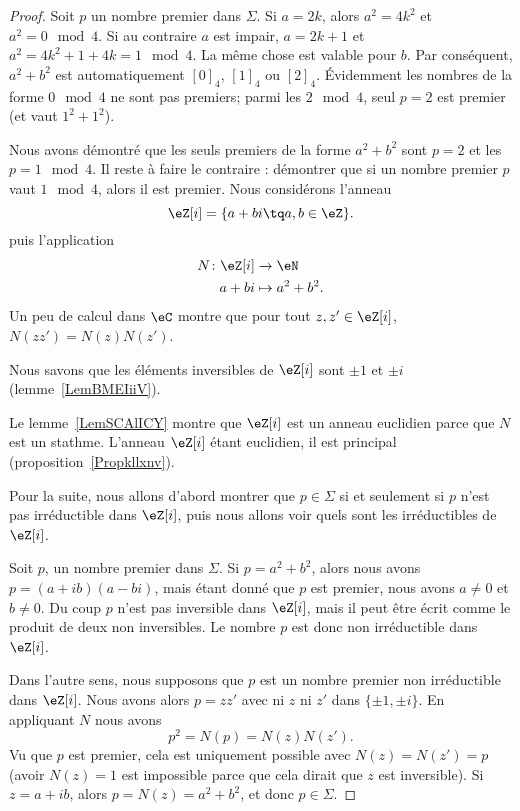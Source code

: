 \begin{proof}
    Soit \( p\) un nombre premier dans \( \Sigma\). Si \( a=2k\), alors \( a^2=4k^2\) et \( a^2=0\mod 4\). Si au contraire \( a\) est impair, \( a=2k+1\) et \( a^2=4k^2+1+4k=1\mod 4\). La même chose est valable pour \( b\). Par conséquent, \( a^2+b^2\) est automatiquement \( [0]_4\), \( [1]_4\) ou \( [2]_4\). Évidemment les nombres de la forme \( 0\mod 4\) ne sont pas premiers; parmi les \( 2\mod 4\), seul \( p=2\) est premier (et vaut \( 1^2+1^2\)).

    Nous avons démontré que les seuls premiers de la forme \( a^2+b^2\) sont \( p=2\) et les \( p=1\mod 4\). Il reste à faire le contraire : démontrer que si un nombre premier \( p\) vaut \( 1\mod 4\), alors il est premier. Nous considérons l'anneau
    \begin{equation}
        \eZ[i]=\{ a+bi\tq a,b\in \eZ \}.
    \end{equation}
    puis l'application
    \begin{equation}
        \begin{aligned}
            N\colon \eZ[i]&\to \eN \\
            a+bi&\mapsto a^2+b^2.
        \end{aligned}
    \end{equation}
    Un peu de calcul dans \( \eC\) montre que pour tout \( z,z'\in \eZ[i]\), \( N(zz')=N(z)N(z')\).


    Nous savons que les éléments inversibles de \( \eZ[i]\) sont \( \pm 1\) et \( \pm i\) (lemme~\ref{LemBMEIiiV}).

    Le lemme~\ref{LemSCAlICY} montre que \( \eZ[i]\) est un anneau euclidien parce que \( N\) est un stathme. L'anneau \( \eZ[i]\) étant euclidien, il est principal (proposition~\ref{Propkllxnv}).



    Pour la suite, nous allons d'abord montrer que \( p\in\Sigma\) si et seulement si \( p\) n'est pas irréductible dans \( \eZ[i]\), puis nous allons voir quels sont les irréductibles de \( \eZ[i]\).

    Soit \( p\), un nombre premier dans \( \Sigma\). Si \( p=a^2+b^2\), alors nous avons \( p=(a+ib)(a-bi)\), mais étant donné que \( p\) est premier, nous avons \( a\neq 0\) et \( b\neq 0\). Du coup \( p\) n'est pas inversible dans \( \eZ[i]\), mais il peut être écrit comme le produit de deux non inversibles. Le nombre \( p\) est donc non irréductible dans \( \eZ[i]\).

    Dans l'autre sens, nous supposons que \( p\) est un nombre premier non irréductible dans \( \eZ[i]\). Nous avons alors \( p=zz'\) avec ni \( z\) ni \( z'\) dans \( \{ \pm 1,\pm i \}\). En appliquant \( N\) nous avons
    \begin{equation}
        p^2=N(p)=N(z)N(z').
    \end{equation}
    Vu que \( p\) est premier, cela est uniquement possible avec \( N(z)=N(z')=p\) (avoir \( N(z)=1\) est impossible parce que cela dirait que \( z\) est inversible). Si \( z=a+ib\), alors \( p=N(z)=a^2+b^2\), et donc \( p\in \Sigma\).


\end{proof}
